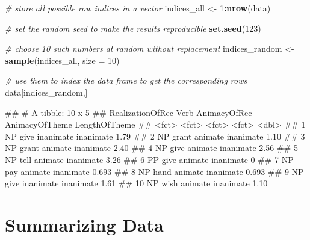 \documentclass[
]{book}
\newenvironment{Shaded}{\begin{snugshade}}{\end{snugshade}}
\newcommand{\AttributeTok}[1]{\textcolor[rgb]{0.13,0.29,0.53}{#1}}
\newcommand{\CommentTok}[1]{\textcolor[rgb]{0.56,0.35,0.01}{\textit{#1}}}
\newcommand{\DecValTok}[1]{\textcolor[rgb]{0.00,0.00,0.81}{#1}}
\newcommand{\FunctionTok}[1]{\textcolor[rgb]{0.13,0.29,0.53}{\textbf{#1}}}
\newcommand{\NormalTok}[1]{#1}
\newcommand{\OtherTok}[1]{\textcolor[rgb]{0.56,0.35,0.01}{#1}}
\newcommand{\SpecialCharTok}[1]{\textcolor[rgb]{0.81,0.36,0.00}{\textbf{#1}}}
\begin{document}
\begin{Shaded}
\begin{Highlighting}[]
\CommentTok{\# store all possible row indices in a vector}
\NormalTok{indices\_all }\OtherTok{\textless{}{-}} \DecValTok{1}\SpecialCharTok{:}\FunctionTok{nrow}\NormalTok{(data)}

\CommentTok{\# set the random seed to make the results reproducible}
\FunctionTok{set.seed}\NormalTok{(}\DecValTok{123}\NormalTok{)}

\CommentTok{\# choose 10 such numbers at random without replacement}
\NormalTok{indices\_random }\OtherTok{\textless{}{-}} \FunctionTok{sample}\NormalTok{(indices\_all, }\AttributeTok{size =} \DecValTok{10}\NormalTok{)}

\CommentTok{\# use them to index the data frame to get the corresponding rows}
\NormalTok{data[indices\_random,]}
\end{Highlighting}
\end{Shaded}

\begin{Shaded}
\begin{Highlighting}[]
\NormalTok{\#\# \# A tibble: 10 x 5}
\NormalTok{\#\#    RealizationOfRec Verb  AnimacyOfRec AnimacyOfTheme LengthOfTheme}
\NormalTok{\#\#    \textless{}fct\textgreater{}            \textless{}fct\textgreater{} \textless{}fct\textgreater{}        \textless{}fct\textgreater{}                  \textless{}dbl\textgreater{}}
\NormalTok{\#\#  1 NP               give  inanimate    inanimate              1.79 }
\NormalTok{\#\#  2 NP               grant animate      inanimate              1.10 }
\NormalTok{\#\#  3 NP               grant animate      inanimate              2.40 }
\NormalTok{\#\#  4 NP               give  animate      inanimate              2.56 }
\NormalTok{\#\#  5 NP               tell  animate      inanimate              3.26 }
\NormalTok{\#\#  6 PP               give  animate      inanimate              0    }
\NormalTok{\#\#  7 NP               pay   animate      inanimate              0.693}
\NormalTok{\#\#  8 NP               hand  animate      inanimate              0.693}
\NormalTok{\#\#  9 NP               give  inanimate    inanimate              1.61 }
\NormalTok{\#\# 10 NP               wish  animate      inanimate              1.10}
\end{Highlighting}
\end{Shaded}

\section{Summarizing Data}\label{summarizing-data}
\end{document}
